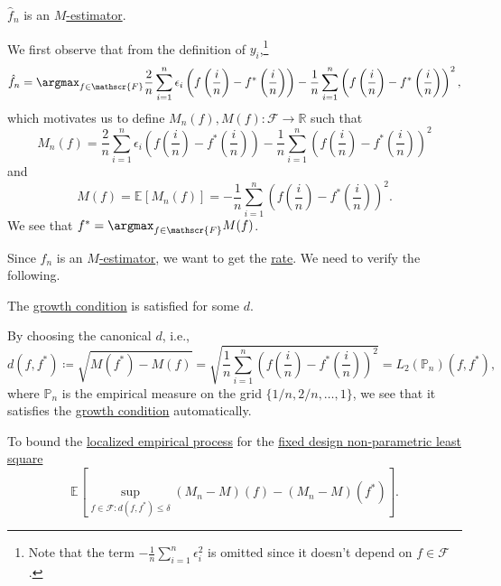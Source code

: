 \begin{remark}
	\(\hat{f} _n \) is an \hyperref[prb:M-estimation]{\(M\)-estimator}.
\end{remark}
\begin{explanation}
	We first observe that from the definition of \(y_i\),\footnote{Note that the term \(-\frac{1}{n} \sum_{i=1}^{n} \epsilon _i ^2\) is omitted since it doesn't depend on \(f \in \mathscr{F} \).}
	\[
		\hat{f} _n = \argmax_{f\in \mathscr{F} } \frac{2}{n} \sum_{i=1}^{n} \epsilon _i \left( f \left( \frac{i}{n}  \right) - f^{\ast} \left( \frac{i}{n} \right)  \right) - \frac{1}{n} \sum_{i=1}^{n} \left( f \left( \frac{i}{n} \right) - f^{\ast} \left( \frac{i}{n} \right) \right) ^2 ,
	\]
	which motivates us to define \(M_n(f) , M(f) \colon \mathscr{F} \to \mathbb{R} \) such that
	\[
		M_n(f) = \frac{2}{n} \sum_{i=1}^{n} \epsilon _i \left( f \left( \frac{i}{n}  \right) - f^{\ast} \left( \frac{i}{n} \right)  \right) - \frac{1}{n} \sum_{i=1}^{n} \left( f \left( \frac{i}{n} \right) - f^{\ast} \left( \frac{i}{n} \right) \right) ^2
	\]
	and
	\[
		M(f)
		= \mathbb{E}_{}\left[M_n (f) \right]
		= - \frac{1}{n} \sum_{i=1}^{n} \left( f \left( \frac{i}{n} \right) - f^{\ast} \left( \frac{i}{n} \right) \right) ^2.
	\]
	We see that \(f^{\ast} = \argmax_{f\in \mathscr{F} } M(f) \).
\end{explanation}

Since \(\hat{f} _n \) is an \hyperref[prb:M-estimation]{\(M\)-estimator}, we want to get the \hyperref[def:rate-of-convergence]{rate}. We need to verify the following.

\begin{claim}
	The \hyperref[def:growth-condition*]{growth condition} is satisfied for some \(d\).
\end{claim}
\begin{explanation}
	By choosing the canonical \(d\), i.e.,
	\[
		d(f, f^{\ast} )
		\coloneqq \sqrt{M(f^{\ast} ) - M(f)}
		= \sqrt{\frac{1}{n} \sum_{i=1}^{n} \left( f \left( \frac{i}{n} \right) - f^{\ast} \left( \frac{i}{n} \right)  \right) ^2}
		= L_2(\mathbb{P} _n) (f, f^{\ast} ),
	\]
	where \(\mathbb{P} _n\) is the empirical measure on the grid \(\{ 1 / n, 2 / n, \dots , 1 \} \), we see that it satisfies the \hyperref[def:growth-condition*]{growth condition} automatically.
\end{explanation}

To bound the \hyperref[def:localized-EP]{localized empirical process} for the \hyperref[prb:fixed-design-non-parametric-LS]{fixed design non-parametric least square}
\[
	\mathbb{E}_{}\left[\sup _{f\in \mathscr{F} \colon d(f, f^{\ast} ) \leq \delta } (M_n - M)(f) - (M_n - M)(f^{\ast} ) \right].
\]

